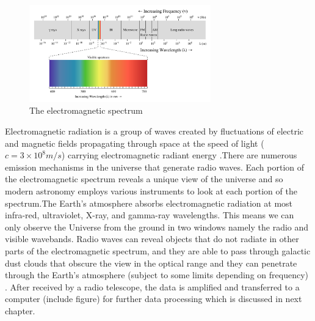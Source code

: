 \begin{figure}[h!]
  \centering
    \includegraphics[width=0.7\textwidth]{images/Electromagnetic-Spectrum.png}
    \caption{The electromagnetic spectrum \citep{ElectromagneticSpectrum}}
  \label{images/Electromagnetic-Spectrum.png}
\end{figure}

Electromagnetic radiation is a group of waves created by fluctuations of electric and magnetic fields propagating through space at the speed of light ($c=3\times 10^{8} m/s$) carrying electromagnetic radiant energy \citep{ElectromagneticSpectrum}.\;There are numerous emission mechanisms in the universe that generate radio waves.
Each portion of the electromagnetic spectrum reveals a unique view of the universe and so modern astronomy employs various instruments to look at each portion of the spectrum.\;The Earth's atmosphere absorbs electromagnetic radiation at most infra-red, ultraviolet, X-ray, and gamma-ray wavelengths. This means we can only observe the Universe from the ground in two windows namely the radio and visible wavebands. Radio waves can reveal objects that do not radiate in other parts of the electromagnetic spectrum, and they are able to pass through galactic dust clouds that obscure the view in the optical range and they can penetrate through the Earth's atmosphere (subject to some limits depending on frequency) \citep{thompson2001interferometry}. After received by a radio telescope, the data is amplified and transferred to a computer (include figure) for further  data processing which is discussed in next chapter.



